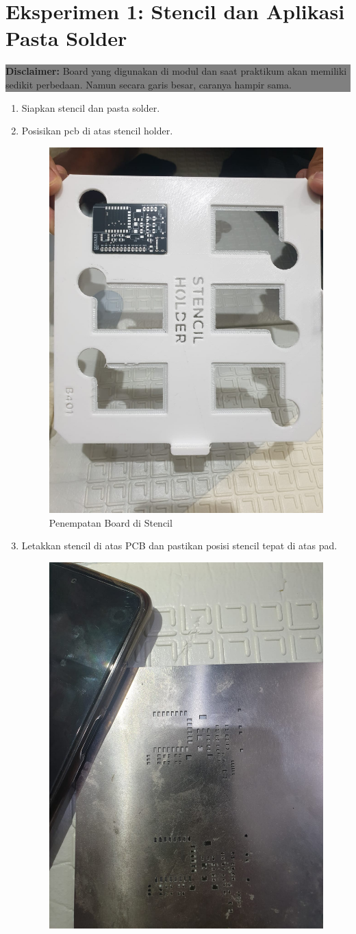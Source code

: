\section{Eksperimen 1: Stencil dan Aplikasi Pasta Solder}
\begin{center}
    \colorbox{gray}{\parbox{0.8\linewidth}{\textbf{Disclaimer:} Board yang digunakan di modul dan saat praktikum akan memiliki sedikit perbedaan. Namun secara garis besar, caranya hampir sama.}}
\end{center}
\begin{enumerate}
    \item Siapkan stencil dan pasta solder.
    \item Posisikan pcb di atas stencil holder.
    \begin{figure}[H]
        \centering
        \includegraphics[width=0.4\linewidth]{P4/img/1_board_minsys_ke_holder_stencil.jpeg}
        \caption{Penempatan Board di Stencil}
        \label{fig:PenempatanBoarddiStencil}
    \end{figure}
    \item Letakkan stencil di atas PCB dan pastikan posisi stencil tepat di atas pad.
    \begin{figure}[H]
        \centering
        \includegraphics[width=0.4\linewidth]{P4/img/2_pastikan_stencil_pas.jpeg}

\end{figure}
\end{enumerate}
